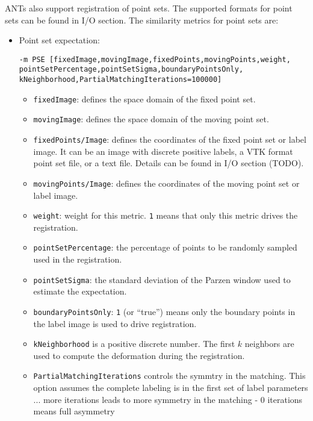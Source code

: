 ANTs also support registration of point sets. The supported formats for point sets can be found in I/O section. The similarity metrics for point sets are:
\begin{itemize}
    \item Point set expectation: 
     \begin{verbatim}
-m PSE [fixedImage,movingImage,fixedPoints,movingPoints,weight,
pointSetPercentage,pointSetSigma,boundaryPointsOnly,
kNeighborhood,PartialMatchingIterations=100000]
    \end{verbatim}
    \begin{itemize}
        \item \verb"fixedImage": defines the space domain of the fixed point set.
        \item \verb"movingImage": defines the space domain of the moving point set.
        \item \verb"fixedPoints/Image": defines the coordinates of the fixed point set or label image. It can be an image with discrete positive labels, a VTK format point set file, or a text file. Details can be found in I/O section (TODO).
        \item \verb"movingPoints/Image": defines the coordinates of the moving point set or label image. 
        \item \verb"weight": weight for this metric. \verb"1" means that only this metric drives the registration.
        \item \verb"pointSetPercentage": the percentage of points to be randomly sampled used in the registration.
        \item \verb"pointSetSigma": the standard deviation of the Parzen window used to estimate the expectation. 
        \item \verb"boundaryPointsOnly":  \verb"1" (or ``true'') means only the boundary points in the label image is used to drive registration.
        \item \verb"kNeighborhood" is a positive discrete number. The first $k$ neighbors are used to compute the deformation during the registration. 
        \item \verb"PartialMatchingIterations" controls the symmtry in the matching. This option assumes the complete labeling is in the first set of label parameters ... more iterations leads to more symmetry in the matching  - 0 iterations means full asymmetry 
    \end{itemize}


\end{itemize}
